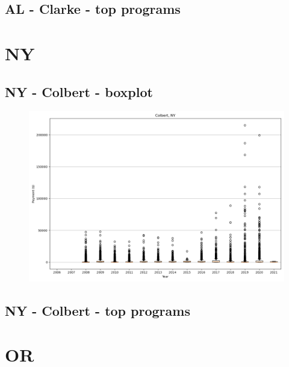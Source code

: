 \subsection*{AL - Clarke - top programs}

\newpage
\section*{NY}
\subsection*{NY - Colbert - boxplot}
\begin{figure}[h]
\centering
\includegraphics[width=7in]{../output/boxplots/counties/Colbert-NY_boxplot.png}
\end{figure}


\subsection*{NY - Colbert - top programs}

\newpage
\section*{OR}
